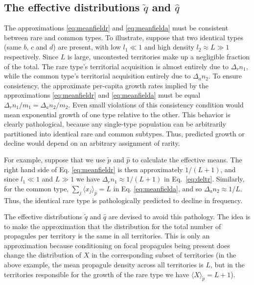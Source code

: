 \documentclass[12pt]{article}
\begin{document}
\subsection*{The effective distributions $\tilde{q}$ and $\hat{q}$}

The approximations \eqref{eq:meanfieldr} and \eqref{eq:meanfielda} must be consistent between rare and common types. To illustrate, suppose that two identical types (same $b$, $c$ and $d$) are present, with low $l_1\ll 1$ and high density $l_2\approx L\gg 1$ respectively. Since $L$ is large, uncontested territories make up a negligible fraction of the total. The rare type's territorial acquisition is almost entirely due to $\Delta_r n_1$, while the common type's territorial acquisition entirely due to $\Delta_a n_2$. To ensure consistency, the approximate per-capita growth rates implied by the approximations \eqref{eq:meanfieldr} and \eqref{eq:meanfielda} must be equal $\Delta_r n_1/m_1 = \Delta_a n_2/m_2$. Even small violations of this consistency condition would mean exponential growth of one type relative to the other. This behavior is clearly pathological, because any single-type population can be arbitrarily partitioned into identical rare and common subtypes. Thus, predicted growth or decline would depend on an arbitrary assignment of rarity.

For example, suppose that we use $\tilde{p}$ and $\hat{p}$ to calculate the effective means. The right hand side of Eq. \eqref{eq:meanfieldr} is then approximately $1/(L+1)$, and since $l_1\ll 1$ and $L\gg 1$ we have $\Delta_r n_1 \approx 1/(L+1)$ in Eq.~\eqref{eq:deltr}. Similarly, for the common type, $\sum_j \langle x_j\rangle_{\hat{p}} = L$ in Eq. \eqref{eq:meanfielda}, and so $\Delta_a n_2 \approx 1/L$. Thus, the identical rare type is  pathologically predicted to decline in frequency.

The effective distributions $\tilde{q}$ and $\hat{q}$ are devised to avoid this pathology. The idea is to make the approximation that the distribution for the total number of propagules per territory is the same in all territories. This is only an approximation because conditioning on focal propagules being present does change the distribution of $X$ in the corresponding subset of territories (in the above example, the mean propagule density across all territories is $L$, but in the territories responsible for the growth of the rare type we have $\langle X \rangle_{\tilde{p}}=L+1$). 
\end{document}
